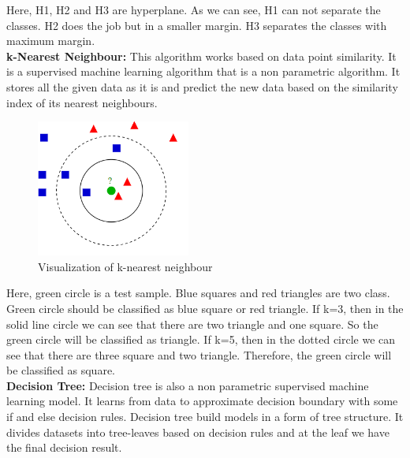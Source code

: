 Here, H1, H2 and H3 are hyperplane. As we can see, H1 can not separate the classes. H2 does the job but in a smaller margin. H3 separates the classes with maximum margin.\\[5pt]

\textbf{k-Nearest Neighbour:} This algorithm works based on data point similarity. It is a supervised machine learning algorithm that is a non parametric algorithm. It stores all the given data as it is and predict the new data based on the similarity index of its nearest neighbours.

\begin{figure}[H]
    \centering
    \includegraphics[width=0.45\textwidth]{knn}
    \caption{Visualization of k-nearest neighbour \cite{wiki:K-nearest_neighbors_algorithm} }
    \label{fig:KNNfig}
\end{figure}

Here, green circle is a test sample. Blue squares and red triangles are two class. Green circle should be classified as blue square or red triangle. If k=3, then in the solid line circle we can see that there are two triangle and one square. So the green circle will be classified as triangle. If k=5, then in the dotted circle we can see that there are three square and two triangle. Therefore, the green circle will be classified as square. \\[5pt]

\textbf{Decision Tree:} Decision tree is also a non parametric supervised machine learning model. It learns from data to approximate decision boundary with some if and else decision rules. Decision tree build models in a form of tree structure. It divides datasets into tree-leaves based on decision rules and at the leaf we have the final decision result.

